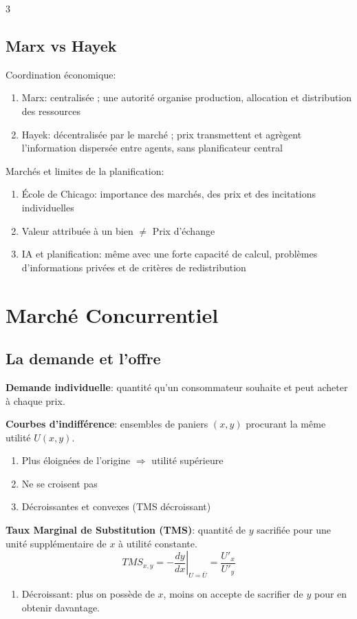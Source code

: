 \documentclass[12pt, a4paper]{article}
\begin{document}
\begin{multicols*}{3}
\subsection{Marx vs Hayek}

Coordination économique:
\begin{enumerate}[\roman*.]
  \item Marx: centralisée ; une autorité organise production, allocation et distribution des ressources
  \item Hayek: décentralisée par le marché ; prix transmettent et agrègent l'information dispersée entre agents, sans planificateur central
\end{enumerate}

Marchés et limites de la planification:
\begin{enumerate}[\roman*.]
  \item École de Chicago: importance des marchés, des prix et des incitations individuelles
  \item Valeur attribuée à un bien $\neq$ Prix d'échange
  \item IA et planification: même avec une forte capacité de calcul, problèmes d'informations privées et de critères de redistribution
\end{enumerate}

\colbreak
\section{Marché Concurrentiel}

\subsection{La demande et l'offre}

\textbf{Demande individuelle}: quantité qu'un consommateur souhaite et peut acheter à chaque prix.

\textbf{Courbes d'indifférence}: ensembles de paniers $(x,y)$ procurant la même utilité $U(x,y)$.
\begin{enumerate}[\roman*.]
  \item Plus éloignées de l'origine $\Rightarrow$ utilité supérieure
  \item Ne se croisent pas
  \item Décroissantes et convexes (TMS décroissant)
\end{enumerate}

\textbf{Taux Marginal de Substitution (TMS)}: quantité de $y$ sacrifiée pour une unité supplémentaire de $x$ à utilité constante.
\[
TMS_{x,y}=-\left.\frac{dy}{dx}\right|_{U=\bar U}
=\frac{U'_x}{U'_y}
\]
\begin{enumerate}[\roman*.]
  \item Décroissant: plus on possède de $x$, moins on accepte de sacrifier de $y$ pour en obtenir davantage.
\end{enumerate}


\end{multicols*}
\end{document}
